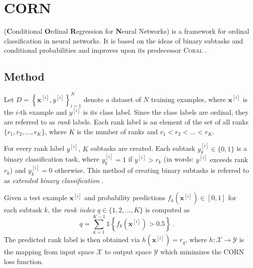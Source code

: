 \section{CORN} \label{sec:ordinal:corn}
\corn{} (\textbf{C}onditional \textbf{O}rdinal \textbf{R}egression for \textbf{N}eural Networks) \cite{corn}
is a framework for ordinal classification in neural networks.
It is based on the ideas of binary subtasks and conditional probabilities
and improves upon its predecessor \textsc{Coral} \cite{coral}.



\subsection{Method} \label{sec:corn:method}

Let $D = \left\{ \mathbf{x}^{[i]}, y^{[i]} \right\}_{i=1}^N$ denote a dataset of $N$ training examples,
where $\mathbf{x}^{[i]}$ is the $i$-th example and $y^{[i]}$ is its class label.
Since the class labels are ordinal, they are referred to as \emph{rank} labels.
Each rank label is an element of the set of all ranks $\{r_1, r_2, \ldots, r_K\}$,
  where
  $K$ is the number of ranks
  and $r_1 < r_2 < \ldots < r_K$.

For every rank label $y^{[i]}$,
$K$ subtasks are created. %
Each subtask $y^{[i]}_k \in \{0, 1\}$ is a binary classification task,
  where
    $y^{[i]}_k = 1$ if $y^{[i]} > r_k$ (in words: {$y^{[i]}$ exceeds rank $r_k$})
    and $y^{[i]}_k = 0$ otherwise.
This method of creating binary subtasks is referred to as \emph{extended binary classification} \cite{extended_binary}.

Given a test example $\mathbf{x}^{[i]}$
and probability predictions $f_k(\mathbf{x}^{[i]}) \in [0,1]$ for each subtask $k$,
the \emph{rank index} $q \in \{1, 2, \ldots, K\}$ is computed as
\begin{equation}
  q = \sum_{k=1}^{K-1} \mathbb{1}\left\{f_k(\mathbf{x}^{[i]}) > 0.5\right\} \ .
\end{equation}
The predicted rank label is then obtained via
$h(\mathbf{x}^{[i]}) = r_q$,
where $h: \mathcal{X} \to \mathcal{Y}$ is the mapping from input space $\mathcal{X}$ to output space $\mathcal{Y}$ %
which minimizes the CORN loss function.


